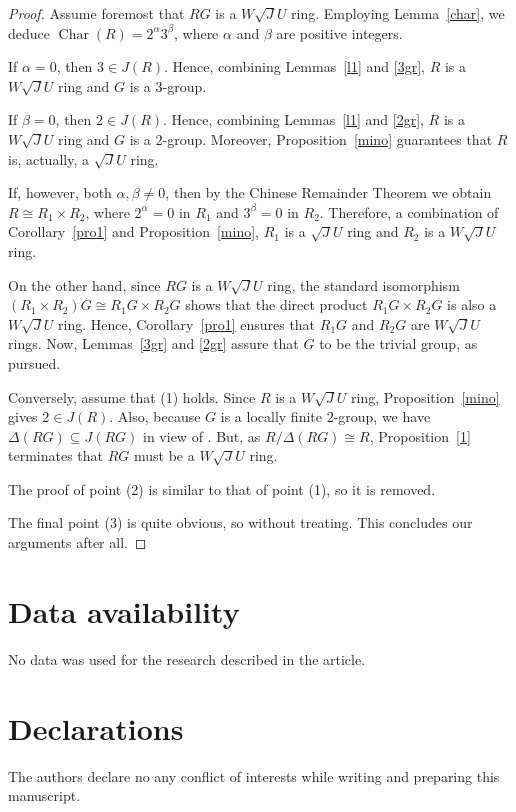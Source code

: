 \documentclass[12pt]{amsart}
\begin{document}
\begin{proof} Assume foremost that $RG$ is a $W\sqrt{J}U$ ring. Employing Lemma~\ref{char}, we deduce $\operatorname{Char}(R)=2^{\alpha}3^{\beta}$, where $\alpha$ and $\beta$ are positive integers.

If $\alpha = 0$, then $3 \in J(R)$. Hence, combining Lemmas~\ref{l1} and \ref{3gr}, $R$ is a $W\sqrt{J}U$ ring and $G$ is a $3$-group.

If $\beta = 0$, then $2 \in J(R)$. Hence, combining Lemmas~\ref{l1} and \ref{2gr}, $R$ is a $W\sqrt{J}U$ ring and $G$ is a $2$-group. Moreover, Proposition~\ref{mino} guarantees that $R$ is, actually, a $\sqrt{J}U$ ring.

If, however, both $\alpha, \beta \neq 0$, then by the Chinese Remainder Theorem we obtain $R \cong R_1 \times R_2$, where $2^{\alpha}=0$ in $R_1$ and $3^{\beta}=0$ in $R_2$. Therefore, a combination of Corollary~\ref{pro1} and Proposition~\ref{mino}, $R_1$ is a $\sqrt{J}U$ ring and $R_2$ is a $W\sqrt{J}U$ ring. 

On the other hand, since $RG$ is a $W\sqrt{J}U$ ring, the standard isomorphism $(R_1 \times R_2)G \cong R_1G \times R_2G$ shows that the direct product $R_1G \times R_2G$ is also a $W\sqrt{J}U$ ring. Hence, Corollary~\ref{pro1} ensures that $R_1G$ and $R_2G$ are $W\sqrt{J}U$ rings. Now, Lemmas~\ref{3gr} and \ref{2gr} assure that $G$ to be the trivial group, as pursued.

Conversely, assume that (1) holds. Since $R$ is a $W\sqrt{J}U$ ring, Proposition~\ref{mino} gives $2 \in J(R)$.
Also, because $G$ is a locally finite $2$-group, we have $\Delta(RG) \subseteq J(RG)$ in view of \cite[Lemma 2]{zhou}. But, as $R/\Delta(RG) \cong R$, Proposition~\ref{1} terminates that $RG$ must be a $W\sqrt{J}U$ ring.

The proof of point (2) is similar to that of point (1), so it is removed.

The final point (3) is quite obvious, so without treating. This concludes our arguments after all.
\end{proof}

\medskip
\medskip

\section*{Data availability}
No data was used for the research described in the article.

\medskip
\medskip

\section*{Declarations}
The authors declare no any conflict of interests while writing and preparing this manuscript.
\end{document}
